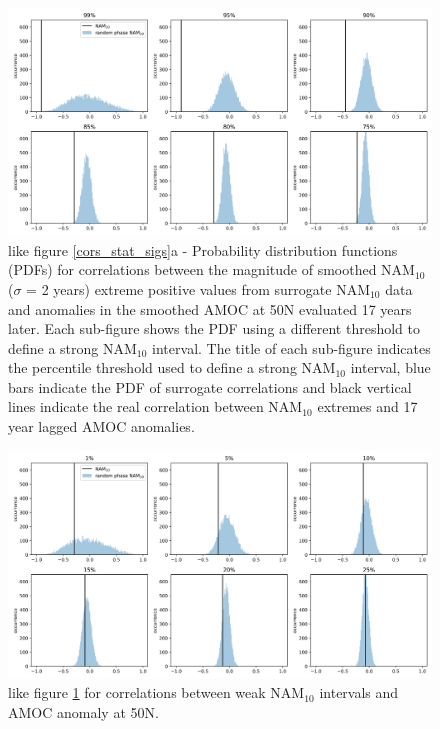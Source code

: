 \begin{figure}[h!]
\begin{center}
\noindent\includegraphics[width =\linewidth]{Figures/Figures-surface/bootstraps_different_threshold_strong.png} 
\caption{like figure \ref{cors_stat_sigs}a - Probability distribution functions (PDFs) for correlations between the magnitude of smoothed NAM$_{10}$ ($\sigma$ = 2 years) extreme positive values from surrogate NAM$_{10}$ data and anomalies in the smoothed AMOC at 50N evaluated 17 years later. Each sub-figure shows the PDF using a different threshold to define a strong NAM$_{10}$ interval. The title of each sub-figure indicates the percentile threshold used to define a strong NAM$_{10}$ interval, blue bars indicate the PDF of surrogate correlations and black vertical lines indicate the real correlation between NAM$_{10}$ extremes and 17 year lagged AMOC anomalies.}
\label{different_thresh_strong}
\end{center}
\end{figure}

\begin{figure}[h!]
\begin{center}
\noindent\includegraphics[width =\linewidth]{Figures/Figures-surface/bootstraps_different_threshold_weak.png} 
\caption{like figure \ref{different_thresh_strong} for correlations between weak NAM$_{10}$ intervals and AMOC anomaly at 50N.}
\label{different_thresh_weak}
\end{center}
\end{figure}

